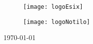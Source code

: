 \documentclass[
11pt, %
oneside, %
english, %
singlespacing, %
headsepline, %
]{MastersDoctoralThesis} %
\begin{document}
\begin{titlepage}
\begin{center}
\vfill


\begin{figure}[t]
  \centering
  \begin{minipage}[t]{0.45\textwidth}
	  \texttt{[image: logoEsix]}
  \end{minipage}
  \hfill
  \begin{minipage}[t]{0.3\textwidth}
	  \texttt{[image: logoNotilo]}
  \end{minipage}
\end{figure}


{\large \today}\\[4cm] %

\vfill
\end{center}
\end{titlepage}


%
%
%
%
\end{document}
